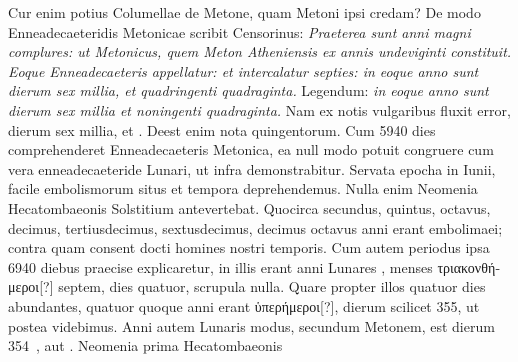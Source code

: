 Cur enim potius Columellae de Metone, quam
Metoni ipsi credam?
De modo Enneadecaeteridis Metonicae
scribit Censorinus:
 \emph{Praeterea sunt anni magni complures: ut Metonicus,
quem Meton Atheniensis ex annis undeviginti constituit.}
\emph{Eoque
Enneadecaeteris appellatur: et intercalatur septies: in eoque
anno sunt dierum sex millia, et quadringenti quadraginta.}
Legendum:
\emph{in eoque anno sunt dierum sex millia et noningenti quadraginta.}
Nam ex notis vulgaribus fluxit error, dierum sex millia,
 et .
Deest enim 
 nota quingentorum.
Cum 5940 dies comprehenderet
Enneadecaeteris Metonica, ea null modo potuit
congruere cum vera enneadecaeteride Lunari, ut infra demonstrabitur.
Servata epocha in  Iunii, facile embolismorum
situs et tempora deprehendemus.
Nulla enim Neomenia Hecatombaeonis
Solstitium antevertebat.
Quocirca secundus, quintus,
octavus, decimus, tertiusdecimus, sextusdecimus, decimus octavus
anni erant embolimaei; contra quam consent docti homines nostri
temporis.
Cum autem periodus ipsa 6940 diebus praecise explicaretur,
in illis erant anni Lunares ,
 menses \textgreek{τριακονθήμεροι[?]} septem,
dies quatuor, scrupula nulla.
Quare propter illos quatuor dies abundantes,
quatuor quoque anni erant \textgreek{ὑπερήμεροι[?]}, dierum scilicet
355, ut postea videbimus.
Anni autem Lunaris modus, secundum
Metonem, est dierum 354~, aut .
Neomenia prima Hecatombaeonis

